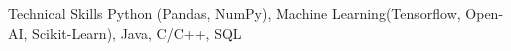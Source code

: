 

\begin{cvskills}

  \cvskill
    {Technical Skills} %
    {Python (Pandas, NumPy), Machine Learning(Tensorflow, Open-AI, Scikit-Learn), Java, C/C++, SQL} %

    


\end{cvskills}
